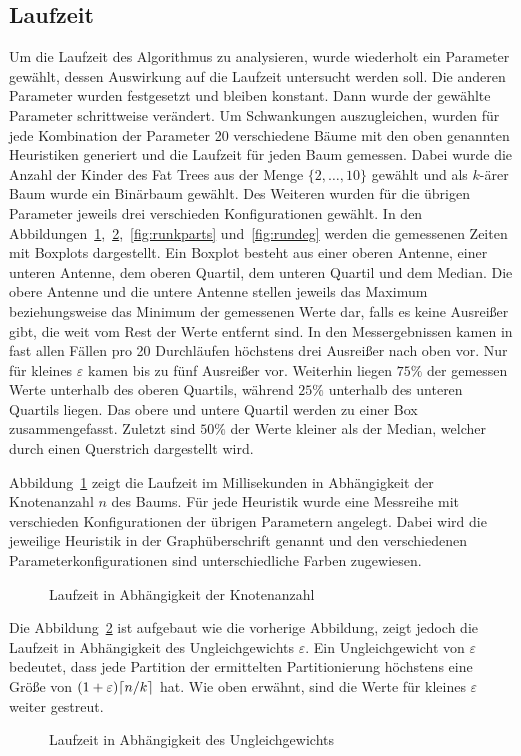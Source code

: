 \subsection{Laufzeit}
Um die Laufzeit des Algorithmus zu analysieren, wurde wiederholt ein Parameter gewählt, dessen Auswirkung auf die Laufzeit untersucht werden soll.
Die anderen Parameter wurden festgesetzt und bleiben konstant.
Dann wurde der gewählte Parameter schrittweise verändert.
Um Schwankungen auszugleichen, wurden für jede Kombination der Parameter 20 verschiedene Bäume mit den oben genannten Heuristiken generiert und die Laufzeit für jeden Baum gemessen.
Dabei wurde die Anzahl der Kinder des Fat Trees aus der Menge $\{2, \ldots, 10\}$ gewählt und als $k$\hyp ärer Baum wurde ein Binärbaum gewählt.
Des Weiteren wurden für die übrigen Parameter jeweils drei verschieden Konfigurationen gewählt.
In den Abbildungen~\ref{fig:runnodes},~\ref{fig:runimb},~\ref{fig:runkparts} und~\ref{fig:rundeg} werden die gemessenen Zeiten mit Boxplots dargestellt.
Ein Boxplot besteht aus einer oberen Antenne, einer unteren Antenne, dem oberen Quartil, dem unteren Quartil und dem Median.
 Die obere Antenne und die untere Antenne stellen jeweils das Maximum beziehungsweise das Minimum der gemessenen Werte dar, falls es keine Ausreißer gibt, die weit vom Rest der Werte entfernt sind.
In den Messergebnissen kamen in fast allen Fällen pro 20 Durchläufen höchstens drei Ausreißer nach oben vor.
Nur für kleines $\varepsilon$ kamen bis zu fünf Ausreißer vor.
Weiterhin liegen $75\%$ der gemessen Werte unterhalb des oberen Quartils, während $25\%$ unterhalb des unteren Quartils liegen.
Das obere und untere Quartil werden zu einer Box zusammengefasst.
Zuletzt sind $50\%$ der Werte kleiner als der Median, welcher durch einen Querstrich dargestellt wird.

Abbildung~\ref{fig:runnodes} zeigt die Laufzeit im Millisekunden in Abhängigkeit der Knotenanzahl $n$ des Baums.
Für jede Heuristik wurde eine Messreihe mit verschieden Konfigurationen der übrigen Parametern angelegt.
Dabei wird die jeweilige Heuristik in der Graphüberschrift genannt und den verschiedenen Parameterkonfigurationen sind unterschiedliche Farben zugewiesen. 
\begin{figure}[t]
    \centering
    \scalebox{0.8}{}
    \caption{Laufzeit in Abhängigkeit der Knotenanzahl}\label{fig:runnodes}
\end{figure}

Die Abbildung~\ref{fig:runimb} ist aufgebaut wie die vorherige Abbildung, zeigt jedoch die Laufzeit in Abhängigkeit des Ungleichgewichts $\varepsilon$.
Ein Ungleichgewicht von $\varepsilon$ bedeutet, dass jede Partition der ermittelten Partitionierung höchstens eine Größe von $(1 + \varepsilon) \lceil n/k\rceil$ hat.
Wie oben erwähnt, sind die Werte für kleines $\varepsilon$ weiter gestreut.
\begin{figure}[t]
    \centering
    \scalebox{0.8}{}
    \caption{Laufzeit in Abhängigkeit des Ungleichgewichts}\label{fig:runimb}
\end{figure}

